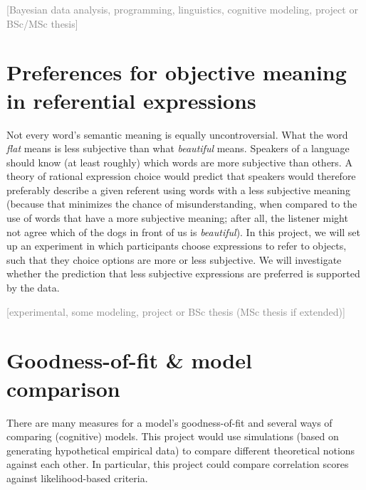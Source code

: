 \documentclass[fleqn,reqno,10pt]{article}
\newcommand{\scope}[1]{\hfill\textcolor{gray}{[#1]}}
\begin{document}
\scope{Bayesian data analysis, programming, linguistics, cognitive modeling, project or BSc/MSc thesis}

\section{Preferences for objective  meaning in referential expressions}

Not every word's semantic meaning is equally uncontroversial. What the word \emph{flat} means is less subjective than what \emph{beautiful} means. Speakers of a language should know (at least roughly) which words are more subjective than others. A theory of rational expression choice would predict that speakers would therefore preferably describe a given referent using words with a less subjective meaning (because that minimizes the chance of misunderstanding, when compared to the use of words that have a more subjective meaning; after all, the listener might not agree which of the dogs in front of us is \emph{beautiful}). In this project, we will set up an experiment in which participants choose expressions to refer to objects, such that they choice options are more or less subjective. We will investigate whether the prediction that less subjective expressions are preferred is supported by the data.

\scope{experimental, some modeling, project or BSc thesis (MSc thesis if extended)}

\section{Goodness-of-fit \& model comparison}

There are many measures for a model's goodness-of-fit and several ways of comparing (cognitive)
models. This project would use simulations (based on generating hypothetical empirical data) to
compare different theoretical notions against each other. In particular, this project could
compare correlation scores against likelihood-based criteria.

\printbibliography[heading=bibintoc]
\end{document}
